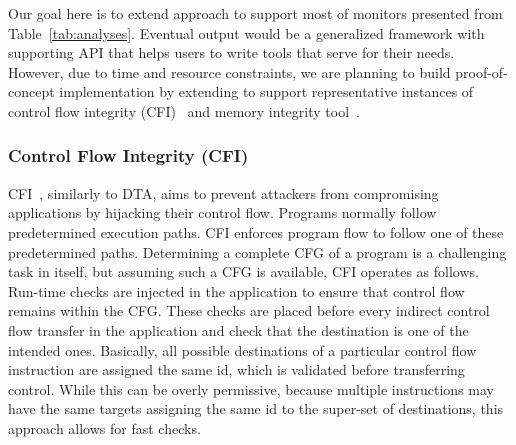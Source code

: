 Our goal here is to extend \sreplica approach to support most of monitors
presented from Table~\ref{tab:analyses}. Eventual output would be a generalized
framework with supporting API that helps users to write tools that serve for
their needs. However, due to time and resource constraints, we are planning to
build proof-of-concept implementation by extending \sreplica to support
representative instances of control flow integrity (CFI)~\cite{} and memory
integrity tool~\cite{}.

\subsubsection{Control Flow Integrity (CFI)} 

CFI~\cite{cfi}, similarly to DTA, aims to prevent attackers from compromising
applications by hijacking their control flow. Programs normally follow
predetermined execution paths. CFI enforces program flow to follow one of these
predetermined paths. Determining a complete CFG of a program is a challenging
task in itself, but assuming such a CFG is available, CFI operates as follows.
Run-time checks are injected in the application to ensure that control flow
remains within the CFG. These checks are placed before every indirect control
flow transfer in the application and check that the destination is one of the
intended ones. Basically, all possible destinations of a particular control
flow instruction are assigned the same id, which is validated before
transferring control. While this can be overly permissive, because multiple
instructions may have the same targets assigning the same id to the super-set
of destinations, this approach allows for fast checks. 


